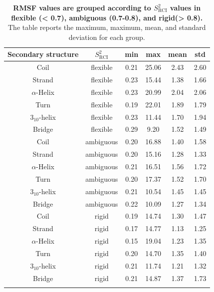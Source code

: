 \begin{table}[H]
\small
\centering
\caption{\textbf{RMSF values are grouped according to $S_{\text{RCI}}^{2}$ values in flexible (< 0.7), ambiguous (0.7-0.8), and rigid(> 0.8).} The table reports the maximum, maximum, mean, and standard deviation for each group.}
\label{tab:plddt_sup:suptable6}
\begin{tabular}{cccccc}
\toprule
Secondary structure & $S_{\text{RCI}}^{2}$ & min & max & mean & std \\ \midrule
Coil           & flexible& 0.21 & 25.06 & 2.43 & 2.60 \\
Strand         & flexible& 0.23 & 15.44 & 1.38 & 1.66 \\
$\alpha$-Helix & flexible& 0.23 & 20.99 & 2.04 & 2.06 \\
Turn           & flexible
& 0.19 & 22.01 & 1.89 & 1.79 \\
$3{_{10}}$-helix      & flexible
& 0.23 & 11.44 & 1.70 & 1.94 \\
Bridge         & flexible& 0.29 & 9.20  & 1.52 & 1.49 \\
\arrayrulecolor[gray]{0.8}\hline
Coil           & ambiguous& 0.20 & 16.88 & 1.40 & 1.58 \\
Strand         & ambiguous& 0.20 & 15.16 & 1.28 & 1.33 \\
$\alpha$-Helix & ambiguous& 0.21 & 16.51 & 1.56 & 1.72 \\
Turn           & ambiguous
& 0.20 & 17.37 & 1.52 & 1.70 \\
$3{_{10}}$-helix      & ambiguous
& 0.21 & 10.54 & 1.45 & 1.45 \\
Bridge         & ambiguous& 0.22 & 10.09 & 1.27 & 1.34 \\
\arrayrulecolor[gray]{0.8}\hline
Coil           & rigid& 0.19 & 14.74 & 1.30 & 1.47 \\
Strand         & rigid& 0.17 & 14.77 & 1.13 & 1.25 \\
$\alpha$-Helix & rigid& 0.15 & 19.04 & 1.23 & 1.35 \\
Turn           & rigid& 0.20 & 14.70 & 1.35 & 1.40 \\
$3{_{10}}$-helix      & rigid& 0.21 & 11.74 & 1.21 & 1.32 \\
Bridge         & rigid& 0.21 & 14.87 & 1.37 & 1.73 \\ \arrayrulecolor{black} \bottomrule
\end{tabular}
\end{table}

